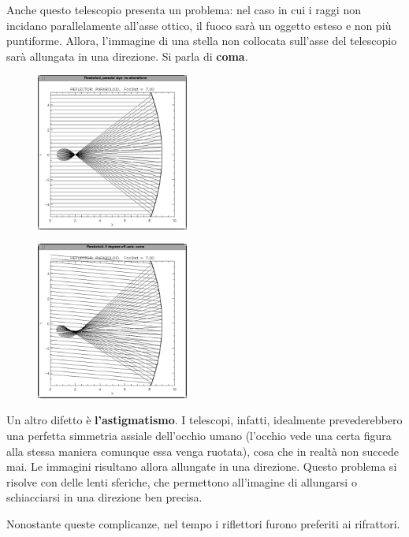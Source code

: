 Anche questo telescopio presenta un problema: nel caso in cui i raggi non incidano parallelamente all'asse ottico, il fuoco sarà un oggetto esteso e non più puntiforme. Allora, l'immagine di una stella non collocata sull'asse del telescopio sarà allungata in una direzione. Si parla di \textbf{coma}.

\begin{minipage}{0.5\textwidth}
    \begin{figure}[H]
        \centering
        \includegraphics[width=5cm]{immagini/specchio_parabolico.png}
    \end{figure}
\end{minipage}
\begin{minipage}{0.5\textwidth}
    \begin{figure}[H]
        \centering
        \includegraphics[width=5cm]{immagini/coma_1.png}
    \end{figure}
\end{minipage}

\vspace{0.4cm}Un altro difetto è \textbf{l'astigmatismo}. I telescopi, infatti, idealmente prevederebbero una perfetta simmetria assiale dell'occhio umano (l'occhio vede una certa figura alla stessa maniera comunque essa venga ruotata), cosa che in realtà non succede mai. Le immagini risultano allora allungate in una direzione. Questo problema si risolve con delle lenti sferiche, che permettono all'imagine di allungarsi o schiacciarsi in una direzione ben precisa.

Nonostante queste complicanze, nel tempo i riflettori furono preferiti ai rifrattori.

